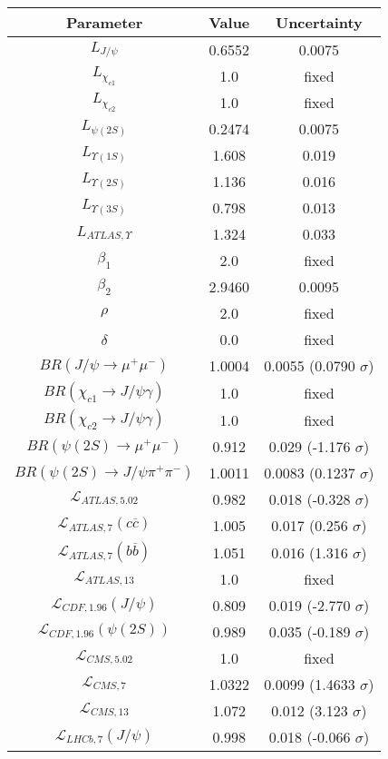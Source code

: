 \begin{table}[h!]
\centering
\begin{tabular}{c|c|c}
Parameter & Value & Uncertainty \\
\hline
$L_{J/\psi}$ & 0.6552 & 0.0075 \\
$L_{\chi_{c1}}$ & 1.0 & fixed \\
$L_{\chi_{c2}}$ & 1.0 & fixed \\
$L_{\psi(2S)}$ & 0.2474 & 0.0075 \\
$L_{\Upsilon(1S)}$ & 1.608 & 0.019 \\
$L_{\Upsilon(2S)}$ & 1.136 & 0.016 \\
$L_{\Upsilon(3S)}$ & 0.798 & 0.013 \\
$L_{ATLAS,\Upsilon}$ & 1.324 & 0.033 \\
$\beta_1$ & 2.0 & fixed \\
$\beta_2$ & 2.9460 & 0.0095 \\
$\rho$ & 2.0 & fixed \\
$\delta$ & 0.0 & fixed \\
$BR(J/\psi\rightarrow\mu^+\mu^-)$ & 1.0004 & 0.0055 (0.0790 $\sigma$) \\
$BR(\chi_{c1}\rightarrow J/\psi\gamma)$ & 1.0 & fixed \\
$BR(\chi_{c2}\rightarrow J/\psi\gamma)$ & 1.0 & fixed \\
$BR(\psi(2S)\rightarrow\mu^+\mu^-)$ & 0.912 & 0.029 (-1.176 $\sigma$) \\
$BR(\psi(2S)\rightarrow J/\psi\pi^+\pi^-)$ & 1.0011 & 0.0083 (0.1237 $\sigma$) \\
$\mathcal L_{ATLAS,5.02}$ & 0.982 & 0.018 (-0.328 $\sigma$) \\
$\mathcal L_{ATLAS,7}(c\overline c)$ & 1.005 & 0.017 (0.256 $\sigma$) \\
$\mathcal L_{ATLAS,7}(b\overline b)$ & 1.051 & 0.016 (1.316 $\sigma$) \\
$\mathcal L_{ATLAS,13}$ & 1.0 & fixed \\
$\mathcal L_{CDF,1.96}(J/\psi)$ & 0.809 & 0.019 (-2.770 $\sigma$) \\
$\mathcal L_{CDF,1.96}(\psi(2S))$ & 0.989 & 0.035 (-0.189 $\sigma$) \\
$\mathcal L_{CMS,5.02}$ & 1.0 & fixed \\
$\mathcal L_{CMS,7}$ & 1.0322 & 0.0099 (1.4633 $\sigma$) \\
$\mathcal L_{CMS,13}$ & 1.072 & 0.012 (3.123 $\sigma$) \\
$\mathcal L_{LHCb,7}(J/\psi)$ & 0.998 & 0.018 (-0.066 $\sigma$) \\

\end{tabular}
\end{table}
